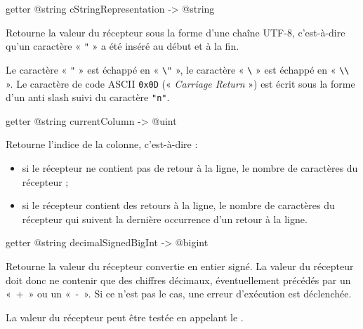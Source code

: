 \begin{galgas3box}
getter @string cStringRepresentation -> @string
\end{galgas3box}

Retourne la valeur du récepteur sous la forme d'une chaîne UTF-8, c'est-à-dire qu'un caractère « \texttt{"} » a été inséré au début et à la fin.

Le caractère « \texttt{"} » est échappé en « \texttt{\textbackslash"} », le caractère « \texttt{\textbackslash} » est échappé en « \texttt{\textbackslash\textbackslash} ». Le caractère de code ASCII \texttt{0x0D} (« \emph{Carriage Return} ») est écrit sous la forme d'un anti slash suivi du caractère \texttt{"n"}.








\begin{galgas3box}
getter @string currentColumn -> @uint
\end{galgas3box}

Retourne l'indice de la colonne, c'est-à-dire :
\begin{itemize}
\item si le récepteur ne contient pas de retour à la ligne, le nombre de caractères du récepteur ;
\item si le récepteur contient des retours à la ligne, le nombre de caractères du récepteur qui suivent la dernière occurrence d'un retour à la ligne.
\end{itemize}








\begin{galgas3box}
getter @string decimalSignedBigInt -> @bigint
\end{galgas3box}

Retourne la valeur du récepteur convertie en entier signé. La valeur du récepteur doit donc ne contenir que des chiffres décimaux, éventuellement précédés par un «~+~» ou un «~-~». Si ce n'est pas le cas, une erreur d'exécution est déclenchée.

La valeur du récepteur peut être testée en appelant le .







